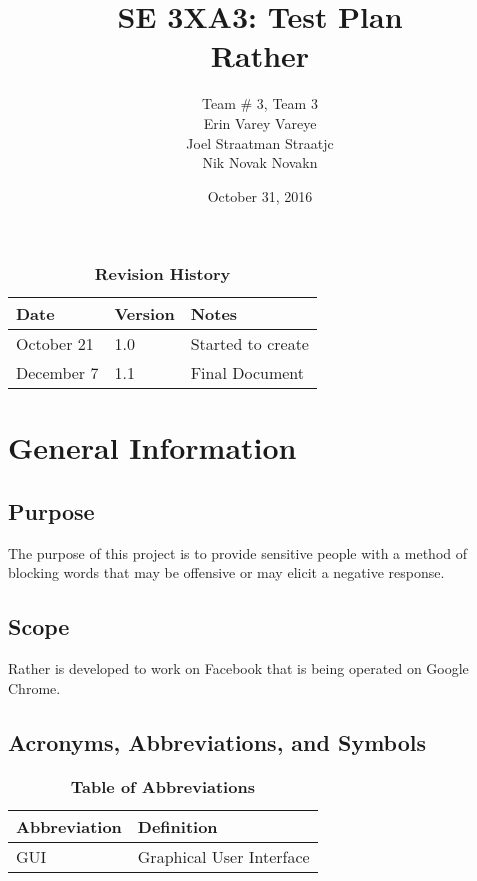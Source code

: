 \documentclass[12pt, titlepage]{article}
\title{SE 3XA3: Test Plan\\Rather}
\author{Team \# 3, Team 3
		\\ Erin Varey Vareye
		\\ Joel Straatman Straatjc
		\\ Nik Novak 	Novakn
}
\date{October 31, 2016}
\begin{document}
\maketitle
{}
\tableofcontents
\listoftables
\begin{table}[bp]
\caption{\bf Revision History}
\begin{tabularx}{\textwidth}{p{3cm}p{2cm}X}
\toprule {\bf Date} & {\bf Version} & {\bf Notes}\\
\midrule
October 21 & 1.0 & Started to create\\
December 7 & 1.1 & Final Document\\
\bottomrule
\end{tabularx}
\end{table}
\newpage
{}

\section{General Information}
\subsection{Purpose}
The purpose of this project is to provide sensitive people with a method of blocking words that may be offensive or may elicit a negative response.
\subsection{Scope}
Rather is developed to work on Facebook that is being operated on Google Chrome.
\subsection{Acronyms, Abbreviations, and Symbols}
	
\begin{table}[hbp]
\caption{\textbf{Table of Abbreviations}} \label{Table}
\begin{tabularx}{\textwidth}{p{3cm}X}
\toprule
\textbf{Abbreviation} & \textbf{Definition} \\
\midrule
GUI & Graphical User Interface\\
\bottomrule
\end{tabularx}
\end{table}
\end{document}
